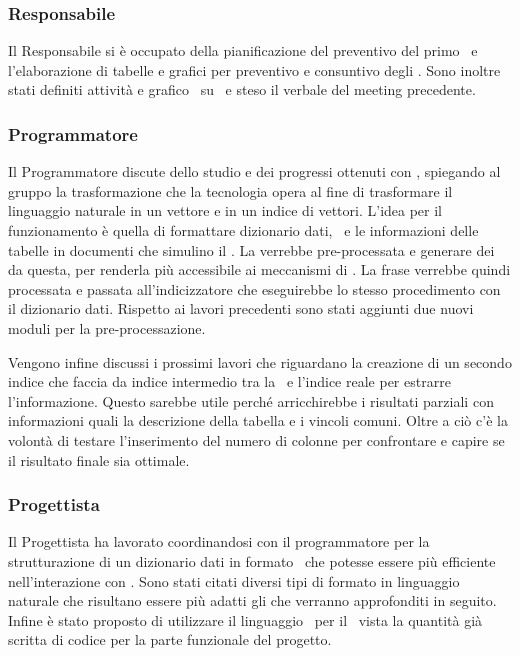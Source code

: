 \subsubsection{Responsabile} 
\par Il Responsabile si è occupato della pianificazione del preventivo del primo \ e l'elaborazione di tabelle e grafici per preventivo e consuntivo degli . Sono inoltre stati definiti attività e grafico \ su \ e steso il verbale del meeting precedente.
\subsubsection{Programmatore}
\par Il Programmatore discute dello studio e dei progressi ottenuti con , spiegando al gruppo la trasformazione che la tecnologia opera al fine di trasformare il linguaggio naturale in un vettore e in un indice di vettori. L'idea per il funzionamento è quella di formattare dizionario dati, \ e le informazioni delle tabelle in documenti che simulino il . La  verrebbe pre-processata e generare dei  da questa, per renderla più accessibile ai meccanismi di . La frase verrebbe quindi processata e passata all'indicizzatore che eseguirebbe lo stesso procedimento con il dizionario dati. Rispetto ai lavori precedenti sono stati aggiunti due nuovi moduli per la pre-processazione.
\par Vengono infine discussi i prossimi lavori che riguardano la creazione di un secondo indice che faccia da indice intermedio tra la \ e l'indice reale per estrarre l'informazione. Questo sarebbe utile perché arricchirebbe i risultati parziali con informazioni quali la descrizione della tabella e i vincoli comuni. Oltre a ciò c'è la volontà di testare l'inserimento del numero di colonne per confrontare e capire se il risultato finale sia ottimale.
\subsubsection{Progettista}
\par Il Progettista ha lavorato coordinandosi con il programmatore per la strutturazione di un dizionario dati in formato \ che potesse essere più efficiente nell'interazione con . Sono stati citati diversi tipi di formato in linguaggio naturale che risultano essere più adatti gli  che verranno approfonditi in seguito. Infine è stato proposto di utilizzare il linguaggio \ per il \ vista la quantità già scritta di codice per la parte funzionale del progetto. 

